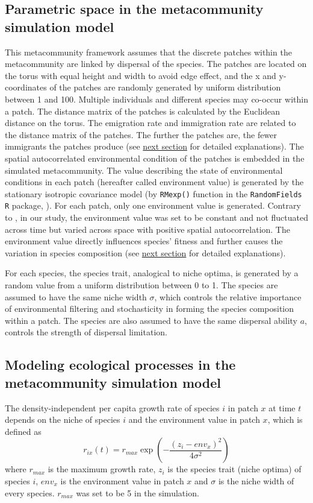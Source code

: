 \subsection{Parametric space in the metacommunity simulation model}
\noindent
This metacommunity framework assumes that the discrete patches within the metacommunity are linked by dispersal of the species. The patches are located on the torus with equal height and width to avoid edge effect, and the x and y-coordinates of the patches are randomly generated by uniform distribution between 1 and 100. Multiple individuals and different species may co-occur within a patch. The distance matrix of the patches is calculated by the Euclidean distance on the torus. The emigration rate and immigration rate are related to the distance matrix of the patches. The further the patches are, the fewer immigrants the patches produce (see \hyperref[Modelc]{next section} for detailed explanations). The spatial autocorrelated environmental condition of the patches is embedded in the simulated metacommunity. The value describing the state of environmental conditions in each patch (hereafter called environment value) is generated by the stationary isotropic covariance model (by \texttt{RMexp()} function in the \texttt{RandomFields} \texttt{R} package, \citealp{schlather2015analysis}). For each patch, only one environment value \DIFaddbegin {}\DIFaddend is generated. Contrary to \citet{thompson2020process}, in our study, the environment value was set to be constant and not fluctuated across time but varied across space with positive spatial autocorrelation. The environment value directly influences species' fitness and further causes the variation in species composition  (see \hyperref[Modelc]{next section} for detailed explanations).

For each species, the species trait, analogical to niche optima, is generated by a random value from a uniform distribution between 0 to 1. The species are assumed to have the same niche width $\sigma$, which controls the relative importance of environmental filtering and stochasticity in forming the species composition within a patch. The species are also assumed to have the same dispersal ability $a$, controls the strength of dispersal limitation.

\subsection{Modeling ecological processes in the metacommunity simulation model}
\noindent
\label{Modelc}
The density-independent per capita growth rate of species $i$ in patch $x$ at time $t$ depends on the niche of species $i$ and the environment value in patch $x$, which is defined as 
\[
r_{ix}(t) = r_{max}\exp(-\frac{(z_i-env_x)^2}{4\sigma^2})
\] 
where $r_{max}$ is the maximum growth rate, $z_i$ is the species trait (niche optima) of species $i$, $env_x$ is the environment value in patch $x$ and $\sigma$ is the niche width of every species. $r_{max}$ was set to be 5 in the simulation.

